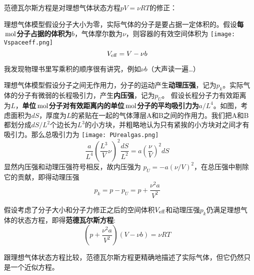 \documentclass[CJK]{beamer}
\begin{document}
\begin{frame}
\bch
范德瓦尔斯方程是对理想气体状态方程$pV = \nu RT$的修正：
\bitem
\item{理想气体模型假设分子大小为零，实际气体的分子是要占据一定体积的。假设{\bf 每$\,\mathrm{mol}$分子占据的体积为$b$}，气体摩尔数为$\nu$，则容器的有效空间体积为
\texttt{[image: Vspaceeff.png]}
\emini
{}
$$ V_{\rm eff} = V - \nu b$$

\skipline

我发现物理书里写乘积的顺序很有讲究，例如$\nu b$（大声读一遍…）
\emini
}
\eitem
\ech
\end{frame}




\begin{frame}
\bch
\bitem
\item{\small 理想气体模型假设分子之间无作用力，分子的运动产生{\bf 动理压强}，记为$p_k$。实际气体的分子有微弱的长程吸引力，产生{\bf 内压强}，记为$p_U$。
假设长程分子力有效距离为$L$，{\bf 单位$\,\mathrm{mol}$分子对有效距离内的单位$\,\mathrm{mol}$分子的平均吸引力为$a/L^4$}。如图，考虑面积为$dS$，厚度为$L$的紧贴在一起的气体薄层A和B之间的作用力。我们把A和B都划分成$dS/L^2$个边长为$L^3$的小方块，并粗略地认为只有紧挨的小方块对之间才有吸引力。那么总吸引力为}
\eitem
{}
\texttt{[image: PUrealgas.png]}
\emini
{}
{\small  
$$ \frac{a}{L^4}\left(\frac{L^3}{V}\nu\right)^2 \frac{dS}{L^2} = a \left(\frac{\nu}{V}\right)^2 dS$$
显然内压强和动理压强符号相反，故内压强为 $p_U = - a(\nu/V)^2$，在总压强中剔除它的贡献，即得动理压强
$$p_k = p - p_U = p + \frac{\nu^2 a}{V^2}$$
}
\emini
\ech
\end{frame}

\begin{frame}
\bch
假设考虑了分子大小和分子力修正之后的空间体积$V_{\rm eff}$和动理压强$p_k$仍满足理想气体的状态方程，即得{\bf 范德瓦尔斯方程}:
$$ \left(p+\frac{\nu^2 a}{V^2}\right)\left(V - \nu b\right) = \nu R T$$

跟理想气体状态方程比较，范德瓦尔斯方程更精确地描述了实际气体，但它仍然只是一个近似方程。
\ech
\end{frame}
\end{document}
